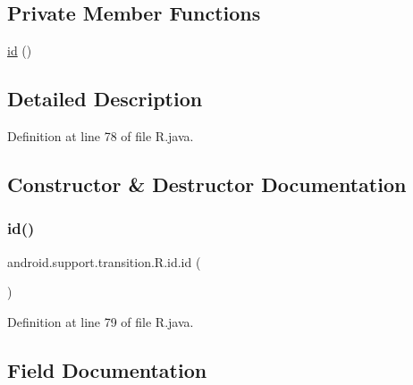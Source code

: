 \subsection*{Private Member Functions}
\begin{DoxyCompactItemize}
\item 
\mbox{\hyperlink{classandroid_1_1support_1_1transition_1_1_r_1_1id_aeafcccb69bf3c6c6b0a44d4e7544abaf}{id}} ()
\end{DoxyCompactItemize}


\subsection{Detailed Description}


Definition at line 78 of file R.\+java.



\subsection{Constructor \& Destructor Documentation}
\mbox{\label{classandroid_1_1support_1_1transition_1_1_r_1_1id_aeafcccb69bf3c6c6b0a44d4e7544abaf}} 
\subsubsection{\texorpdfstring{id()}{id()}}
{\footnotesize\ttfamily android.\+support.\+transition.\+R.\+id.\+id (\begin{DoxyParamCaption}{ }\end{DoxyParamCaption})\hspace{0.3cm}{\ttfamily [private]}}



Definition at line 79 of file R.\+java.


\begin{DoxyCode}{0}

\end{DoxyCode}


\subsection{Field Documentation}
\mbox{\label{classandroid_1_1support_1_1transition_1_1_r_1_1id_a5dee43fd7c62be47631539c1e8a4a24b}} 
